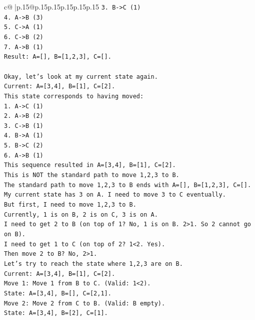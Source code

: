 \documentclass{article}
\begin{document}
{\begin{supertabular}{c@{$\;$}|p{.15\linewidth}@{}p{.15\linewidth}p{.15\linewidth}p{.15\linewidth}p{.15\linewidth}p{.15\linewidth}}
{{{\texttt{3. B{-}>C (1)} \\
\texttt{4. A{-}>B (3)} \\
\texttt{5. C{-}>A (1)} \\
\texttt{6. C{-}>B (2)} \\
\texttt{7. A{-}>B (1)} \\
\texttt{Result: A={[}{]}, B={[}1,2,3{]}, C={[}{]}.} \\
\\ 
\texttt{Okay, let's look at my current state again.} \\
\texttt{Current: A={[}3,4{]}, B={[}1{]}, C={[}2{]}.} \\
\texttt{This state corresponds to having moved:} \\
\texttt{1. A{-}>C (1)} \\
\texttt{2. A{-}>B (2)} \\
\texttt{3. C{-}>B (1)} \\
\texttt{4. B{-}>A (1)} \\
\texttt{5. B{-}>C (2)} \\
\texttt{6. A{-}>B (1)} \\
\texttt{This sequence resulted in A={[}3,4{]}, B={[}1{]}, C={[}2{]}.} \\
\texttt{This is NOT the standard path to move 1,2,3 to B.} \\
\texttt{The standard path to move 1,2,3 to B ends with A={[}{]}, B={[}1,2,3{]}, C={[}{]}.} \\
\texttt{My current state has 3 on A. I need to move 3 to C eventually.} \\
\texttt{But first, I need to move 1,2,3 to B.} \\
\texttt{Currently, 1 is on B, 2 is on C, 3 is on A.} \\
\texttt{I need to get 2 to B (on top of 1? No, 1 is on B. 2>1. So 2 cannot go on B).} \\
\texttt{I need to get 1 to C (on top of 2? 1<2. Yes).} \\
\texttt{Then move 2 to B? No, 2>1.} \\
\texttt{Let's try to reach the state where 1,2,3 are on B.} \\
\texttt{Current: A={[}3,4{]}, B={[}1{]}, C={[}2{]}.} \\
\texttt{Move 1: Move 1 from B to C. (Valid: 1<2).} \\
\texttt{State: A={[}3,4{]}, B={[}{]}, C={[}2,1{]}.} \\
\texttt{Move 2: Move 2 from C to B. (Valid: B empty).} \\
\texttt{State: A={[}3,4{]}, B={[}2{]}, C={[}1{]}.} \\
}}}
\end{supertabular}}
\end{document}
